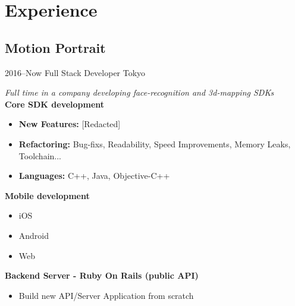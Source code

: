 \documentclass[]{template/friggeri-cv} %
\begin{document}

\section{Experience}


\subsection{Motion Portrait}
\begin{entrylist}


\entry
{2016--Now}
{Full Stack Developer}
{Tokyo}
{\emph{Full time in a company developing face-recognition and 3d-mapping SDKs}\\
\textbf{Core SDK development} 
\begin{itemize}
\item \textbf{New Features:} [Redacted]
\item \textbf{Refactoring:} Bug-fixs, Readability, Speed Improvements, Memory Leaks, Toolchain...
\item \textbf{Languages:} C++, Java, Objective-C++

\end{itemize}
\textbf{Mobile development} 
\begin{itemize}
\item iOS
\item Android
\item Web
\end{itemize}

\textbf{Backend Server - Ruby On Rails (public API)} 
\begin{itemize}
\item Build new API/Server Application from scratch
\end{itemize}
}
\end{entrylist}

\end{document}
